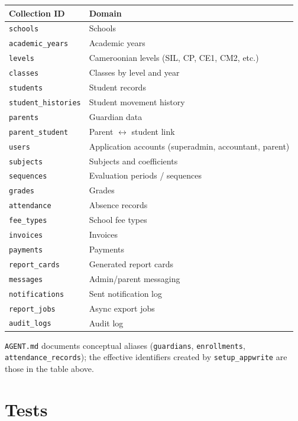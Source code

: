\documentclass[11pt,a4paper]{article}
\begin{document}
\begin{longtable}{@{}lp{8.5cm}@{}}
\toprule
\textbf{Collection ID} & \textbf{Domain} \\
\midrule
\endhead
\texttt{schools} & Schools \\
\texttt{academic\_years} & Academic years \\
\texttt{levels} & Cameroonian levels (SIL, CP, CE1, CM2, etc.) \\
\texttt{classes} & Classes by level and year \\
\texttt{students} & Student records \\
\texttt{student\_histories} & Student movement history \\
\texttt{parents} & Guardian data \\
\texttt{parent\_student} & Parent $\leftrightarrow$ student link \\
\texttt{users} & Application accounts (superadmin, accountant, parent) \\
\texttt{subjects} & Subjects and coefficients \\
\texttt{sequences} & Evaluation periods / sequences \\
\texttt{grades} & Grades \\
\texttt{attendance} & Absence records \\
\texttt{fee\_types} & School fee types \\
\texttt{invoices} & Invoices \\
\texttt{payments} & Payments \\
\texttt{report\_cards} & Generated report cards \\
\texttt{messages} & Admin/parent messaging \\
\texttt{notifications} & Sent notification log \\
\texttt{report\_jobs} & Async export jobs \\
\texttt{audit\_logs} & Audit log \\
\bottomrule
\end{longtable}

\texttt{AGENT.md} documents conceptual aliases (\texttt{guardians}, \texttt{enrollments}, \texttt{attendance\_records}); the effective identifiers created by \texttt{setup\_appwrite} are those in the table above.

\section{Tests}
\end{document}
